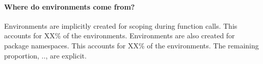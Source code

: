\documentclass[10pt,review,sigplan,anonymous=true]{acmart}
\begin{document}
\paragraph{Where do environments come from?} Environments are implicitly created
for scoping during function calls. This accounts for XX\% of the environments.
Environments are also created for package namespaces. This accounts for XX\% of
the environments. The remaining proportion, .., are explicit.




\end{document}
